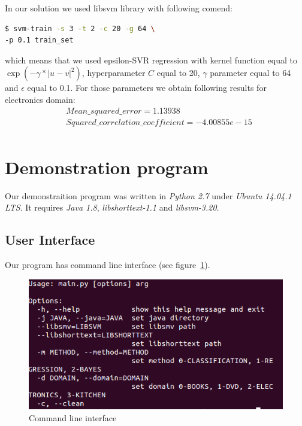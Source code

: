 \documentclass[10pt, a4paper]{article}
\begin{document}
In our solution we used libsvm library with following comend:

\begin{lstlisting}[language=bash]
$ svm-train -s 3 -t 2 -c 20 -g 64 \
-p 0.1 train_set
\end{lstlisting}

which means that we used epsilon-SVR regression with kernel function equal to $\exp(-\gamma*|u-v|^2)$, hyperparameter $C$ equal to 20, $\gamma$ parameter equal to 64 and $\epsilon$ equal to 0.1. For those parameters we obtain following results for electronics domain:
\begin{equation}
\begin{split}
& Mean\_squared\_error = 1.13938 \\
& Squared\_correlation\_coefficient = -4.00855e-15 \\
\end{split}
\end{equation}

\section{Demonstration program}

Our demonstraition program was written in \emph{Python 2.7} under \emph{Ubuntu 14.04.1 LTS}. It requires \emph{Java 1.8}, \emph{libshorttext-1.1} and  \emph{libsvm-3.20}.

\subsection{User Interface}

Our program has command line interface (see figure~\ref{fig:interface}).

\begin{figure}[ht]
\begin{center}
\includegraphics[width=\columnwidth]{help}
\caption{Command line interface}
\label{fig:interface}
\end{center}
\end{figure}
\end{document}
